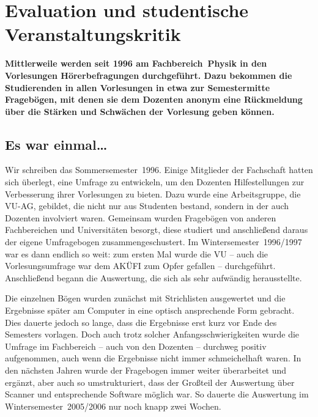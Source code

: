 \section{Evaluation und studentische Veranstaltungskritik}
\begin{multicols}{2}
\textbf{Mittlerweile werden seit 1996 am Fachbereich~Physik in den Vorlesungen Hörerbefragungen durchgeführt. Dazu bekommen die Studierenden in allen Vorlesungen in etwa zur Semestermitte Fragebögen, mit denen sie dem Dozenten anonym eine Rückmeldung über die Stärken und Schwächen der Vorlesung geben können.}

\subsection*{Es war einmal\dots}
Wir schreiben das Sommersemester~1996. Einige Mitglieder der Fachschaft hatten sich überlegt, eine Umfrage zu entwickeln, um den Dozenten Hilfestellungen zur Verbesserung ihrer Vorlesungen zu bieten. Dazu wurde eine Arbeitsgruppe, die VU-AG, gebildet, die nicht nur aus Studenten bestand, sondern in der auch Dozenten involviert waren. Gemeinsam wurden Fragebögen von anderen Fachbereichen und Universitäten besorgt, diese studiert und anschließend daraus der eigene Umfragebogen zusammengeschustert. Im Wintersemester~1996/1997 war es dann endlich so weit: zum ersten Mal wurde die VU -- auch die Vorlesungsumfrage war dem AKÜFI zum Opfer gefallen -- durchgeführt. Anschließend begann die Auswertung, die sich als sehr aufwändig herausstellte.

Die einzelnen Bögen wurden zunächst mit Strichlisten ausgewertet und die Ergebnisse später am Computer in eine optisch ansprechende Form gebracht. Dies dauerte jedoch so lange, dass die Ergebnisse erst kurz vor Ende des Semesters vorlagen. Doch auch trotz solcher Anfangsschwierigkeiten wurde die Umfrage im Fachbereich -- auch von den Dozenten -- durchweg positiv aufgenommen, auch wenn die Ergebnisse nicht immer schmeichelhaft waren. In den nächsten Jahren wurde der Fragebogen immer weiter überarbeitet und ergänzt, aber auch so umstrukturiert, dass der Großteil der Auswertung über Scanner und entsprechende Software möglich war. So dauerte die Auswertung im Wintersemester~2005/2006 nur noch knapp zwei Wochen.


\end{multicols}
